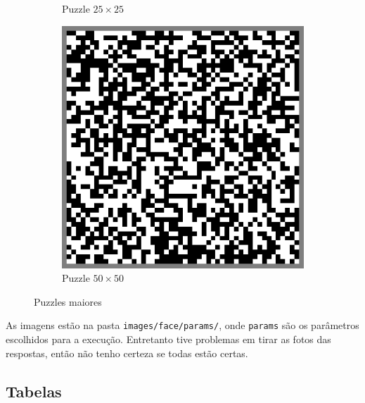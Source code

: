 \documentclass{article}
\newcommand{\file}{\texttt}
\begin{document}
\begin{figure}[h]
\begin{subfigure}{0.3\textwidth}
        \caption{Puzzle \(25 \times 25\)}
        \label{p:random25}
    \end{subfigure}
    \begin{subfigure}{0.3\textwidth}
        \centering
        \includegraphics[width=0.9\linewidth]{random50-border}
        \caption{Puzzle \(50 \times 50\)}
        \label{p:random50}
    \end{subfigure}
    \caption{Puzzles maiores}
    \label{pg:others}
\end{figure}

As imagens estão
na pasta \file{images/face/params/},
onde \file{params} são os parâmetros escolhidos
para a execução.
Entretanto tive problemas em tirar as fotos das respostas,
então não tenho certeza se todas estão certas.

\subsection{Tabelas}
\end{document}
